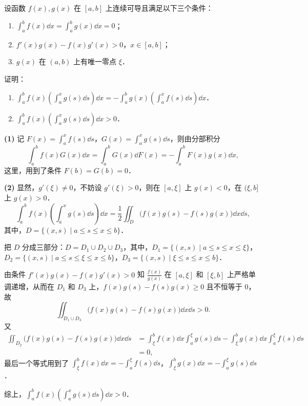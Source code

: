 设函数 $f(x),g(x)$ 在 $[a,b]$ 上连续可导且满足以下三个条件：
\begin{enumerate}[label=(\roman*)]
  \item $\displaystyle \int_a^b f(x)\dd x=\int_a^b g(x)\dd x=0$；
  \item $f'(x)g(x)-f(x)g'(x)>0$，$x\in[a,b]$；
  \item $g(x)$ 在 $(a,b)$ 上有唯一零点 $\xi$．
\end{enumerate}
证明：
\begin{enumerate}
  \item $\displaystyle \int_a^b f(x)\left(\int_a^x g(s)\dd s\right)\dd x=-\int_a^b g(x)\left(\int_a^x f(s)\dd s\right)\dd x$．
  \item $\displaystyle \int_a^b f(x)\left(\int_a^x g(s)\dd s\right)\dd x>0$．
\end{enumerate}
\begin{solution}
  \textbf{(1)} 记 $F(x)=\displaystyle\int_a^x f(s)\dd s$，$G(x)=\displaystyle\int_a^x g(s)\dd s$，则由分部积分
  \[
    \int_a^b f(x)G(x)\dd x=\int_a^b G(x)\dd F(x)=-\int_a^b F(x)g(x)\dd x,
  \]
  这里，用到了条件 $F(b)=G(b)=0$．

  \textbf{(2)} 显然，$g'(\xi)\ne 0$，不妨设 $g'(\xi)>0$，则在 $[a,\xi]$ 上 $g(x)<0$，在 $(\xi,b]$ 上 $g(x)>0$．
  \[
    \int_a^b f(x)\left(\int_a^x g(s)\dd s\right)\dd x
    =\frac{1}{2}\iint_D\bigl(f(x)g(s)-f(s)g(x)\bigr)\dd x\dd s,
  \]
  其中，$D=\{(x,s)\mid a\le s\le x\le b\}$．

  把 $D$ 分成三部分：$D=D_1\cup D_2\cup D_3$，其中，$D_1=\{(x,s)\mid a\le s\le x\le \xi\}$，$D_2=\{(x,s)\mid a\le s\le\xi\le x\le b\}$，$D_3=\{(x,s)\mid \xi\le s\le x\le b\}$．

  由条件 $f'(x)g(x)-f(x)g'(x)>0$ 知 $\frac{f(x)}{g(x)}$ 在 $[a,\xi]$ 和 $[\xi,b]$ 上严格单调递增，从而在 $D_1$ 和 $D_3$ 上，$f(x)g(s)-f(s)g(x)\ge 0$ 且不恒等于 $0$，故
  \[
    \iint_{D_1\cup D_3}\bigl(f(x)g(s)-f(s)g(x)\bigr)\dd x\dd s>0.
  \]
  又
  \begin{align*}
    \iint_{D_2}\bigl(f(x)g(s)-f(s)g(x)\bigr)\dd x\dd s
    &=\int_\xi^b f(x)\dd x\int_a^\xi g(s)\dd s-\int_\xi^b g(x)\dd x\int_a^\xi f(s)\dd s\\
    &=0,
  \end{align*}
  最后一个等式用到了 $\displaystyle\int_\xi^b f(x)\dd x=-\int_a^\xi f(s)\dd s$，$\displaystyle\int_\xi^b g(x)\dd x=-\int_a^\xi g(s)\dd s$．

  综上，$\displaystyle\int_a^b f(x)\left(\int_a^x g(s)\dd s\right)\dd x>0$．
\end{solution}
